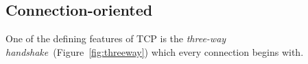 
    \subsection{Connection-oriented}
        One of the defining features of \gls{TCP} is the \textit{three-way handshake}~(Figure~\ref{fig:threeway}) which every connection begins with.

